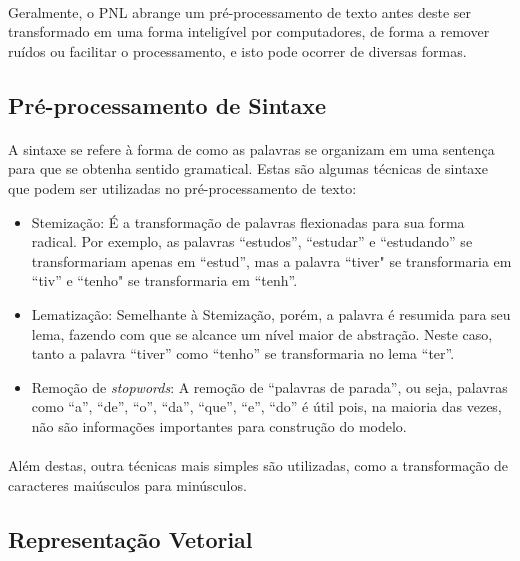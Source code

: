 \documentclass[grad,numbers]{coppe}
\begin{document}
	  \paragraph{}Geralmente, o PNL abrange um pré-processamento de texto antes deste ser transformado em uma forma inteligível por computadores, de forma a remover ruídos ou facilitar o processamento, e isto pode ocorrer de diversas formas.
	  \subsection{Pré-processamento de Sintaxe}
	  	\paragraph{}A sintaxe se refere à forma de como as palavras se organizam em uma sentença para que se obtenha sentido gramatical. Estas são algumas técnicas de sintaxe que podem ser utilizadas no pré-processamento de texto:
	  	\begin{itemize}
	  		\item Stemização: É a transformação de palavras flexionadas para sua forma radical. Por exemplo, as palavras ``estudos'', ``estudar'' e ``estudando'' se transformariam apenas em ``estud'', mas a palavra ``tiver" se transformaria em ``tiv'' e ``tenho" se transformaria em ``tenh''.
	  		\item Lematização: Semelhante à Stemização, porém, a palavra é resumida para seu lema, fazendo com que se alcance um nível maior de abstração. Neste caso, tanto a palavra ``tiver'' como ``tenho'' se transformaria no lema  ``ter''.
	  		\item Remoção de \textit{stopwords}: A remoção de ``palavras de parada'', ou seja, palavras como ``a'', ``de'', ``o'', ``da'', ``que'', ``e'', ``do'' é útil pois, na maioria das vezes, não são informações importantes para construção do modelo.
	  	\end{itemize}
  	\paragraph{}Além destas, outra técnicas mais simples são utilizadas, como a transformação de caracteres maiúsculos para minúsculos.
  	\subsection{Representação Vetorial}
\end{document}
